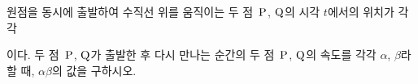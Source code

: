 원점을 동시에 출발하여 수직선 위를 움직이는 두 점~$\mathrm{P}$, $\mathrm{Q}$의 시각 $t$에서의 위치가 각각 \par\smallskip{}\par\smallskip\noindent 이다. 두 점~$\mathrm{P}$, $\mathrm{Q}$가 출발한 후 다시 만나는 순간의 두 점~$\mathrm{P}$, $\mathrm{Q}$의 속도를 각각 $\alpha$, $\beta$라 할 때, $\alpha\beta$의 값을 구하시오.
